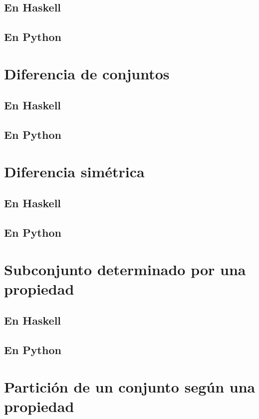 \documentclass[a4paper,12pt,twoside]{book}
\begin{document}
\subsection{En Haskell}
\subsection{En Python}

\section{Diferencia de conjuntos}
\subsection{En Haskell}
\subsection{En Python}

\section{Diferencia simétrica}
\subsection{En Haskell}
\subsection{En Python}

\section{Subconjunto determinado por una propiedad}
\subsection{En Haskell}
\subsection{En Python}

\section{Partición de un conjunto según una propiedad}
\end{document}
